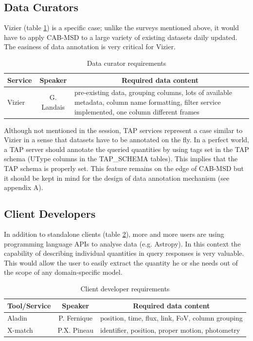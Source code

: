 \documentclass[11pt,a4paper]{ivoa}
\begin{document}
\subsection{Data Curators}
Vizier (table \ref{table:tcurator}) is a specific case; unlike the surveys mentioned above, it would have to apply CAB-MSD to a large variety of existing datasets daily updated. The easiness of data annotation is very critical for Vizier.

\begin{table}[!ht]
\begin{tabular}{|p{7em}|c|p{17em}|}
  \hline
    \multicolumn{1}{|c}{\bfseries Service} & \multicolumn{1}{|c}{\bfseries Speaker} & \multicolumn{1}{|c|}{\bfseries Required data content}
    \\
  \hline
  Vizier & G. Landais & 
pre-existing data, grouping columns, lots of available metadata, column name formatting, filter service implemented, one column different frames
\\
\hline
\end{tabular}
\caption{Data curator requirements}
\label{table:tcurator}
\end{table}

Although not mentioned in the session, TAP services represent a case similar to Vizier in a sense that datasets have to be annotated on the fly. In a perfect world, a TAP server should annotate the queried quantities by using tags set in the TAP schema (UType columns in the TAP\_SCHEMA tables). This implies that the TAP schema is properly set. This feature remains on the edge of CAB-MSD but it should be kept in mind for the design of data annotation mechanism (see appendix A).     

\subsection{Client Developers}
In addition to standalone clients (table \ref{table:tclient}), more and more users are using programming language APIs to analyse data (e.g. Astropy). In this context the capability of describing individual quantities in query responses is very valuable. This would allow the user to easily extract the quantity he or she needs out of the scope of any domain-specific model.
\begin{table}[!ht]
\begin{tabular}{|p{7em}|c|p{17em}|}
  \hline
      \multicolumn{1}{|c}{\bfseries Tool/Service} & \multicolumn{1}{|c}{\bfseries Speaker} & \multicolumn{1}{|c|}{\bfseries Required data content}\\
  \hline
  Aladin & P. Fernique & 
position, time, flux, link, FoV, column grouping
 \\
  X-match & P.X. Pineau & 
identifier, position, proper motion, photometry
 \\
 \hline

\end{tabular}
\caption{Client developer requirements}
\label{table:tclient}
\end{table}
\end{document}
